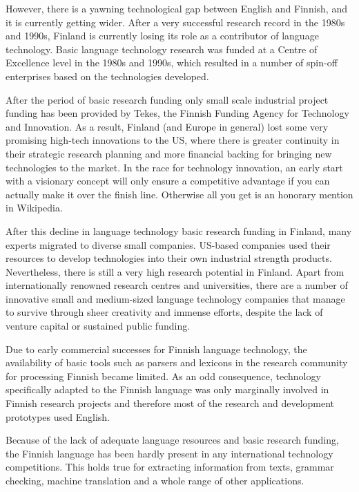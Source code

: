 \begin{multicols}{2}
However, there is a yawning technological gap between English and Finnish, and it is currently getting wider. After a very successful research record in the 1980s and 1990s, Finland is currently losing its role as a contributor of language technology. Basic language technology research was funded at a Centre of Excellence level in the 1980s and 1990s, which resulted in a number of spin-off enterprises based on the technologies developed.

After the period of basic research funding only small scale industrial project funding has been provided by Tekes, the Finnish Funding Agency for Technology and Innovation.  As a result, Finland (and Europe in general) lost some very promising high-tech innovations to the US, where there is greater continuity in their strategic research planning and more financial backing for bringing new technologies to the market. In the race for technology innovation, an early start with a visionary concept will only ensure a competitive advantage if you can actually make it over the finish line.  Otherwise all you get is an honorary mention in Wikipedia.

After this decline in language technology basic research funding in Finland, many experts migrated to diverse small companies.  US-based companies used their resources to develop technologies into their own industrial strength products. Nevertheless, there is still a very high research potential in Finland. Apart from internationally renowned research centres and universities, there are a number of innovative small and medium-sized language technology companies that manage to survive through sheer creativity and immense efforts, despite the lack of venture capital or sustained public funding.

Due to early commercial successes for Finnish language technology, the availability of basic tools such as parsers and lexicons in the research community for processing Finnish became limited. As an odd consequence, technology specifically adapted to the Finnish language was only marginally involved in Finnish research projects and therefore most of the research and development prototypes used English.

Because of the lack of adequate language resources and basic research funding, the Finnish language has been hardly present in any international technology competitions. This holds true for extracting information from texts, grammar checking, machine translation and a whole range of other applications.


\end{multicols}

